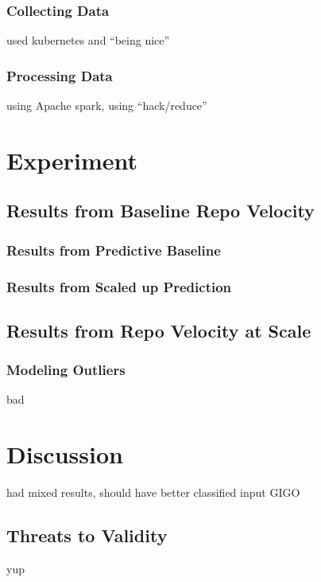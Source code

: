 \documentclass{article}
\begin{document}
\subsubsection{Collecting Data}

used kubernetes and ``being nice''

\subsubsection{Processing Data}

using Apache spark, using ``hack/reduce''

\section{Experiment}

\subsection{Results from Baseline Repo Velocity}

\subsubsection{Results from Predictive Baseline}

\subsubsection{Results from Scaled up Prediction}

\subsection{Results from Repo Velocity at Scale}


\subsubsection{Modeling Outliers}

bad 

\section{Discussion}

had mixed results, should have better classified input GIGO

\subsection{Threats to Validity}

 yup



\end{document}
